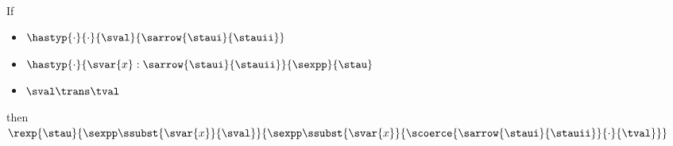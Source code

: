\begin{corollary} \ \\
  If
  \begin{itemize}
  \item $\hastyp{\cdot}{\cdot}{\sval}{\sarrow{\staui}{\stauii}}$
  \item $\hastyp{\cdot}{\svar{x} : \sarrow{\staui}{\stauii}}{\sexpp}{\stau}$
  \item $\sval \trans \tval$
  \end{itemize}
  then
  $\rexp{\stau}{\sexpp\ssubst{\svar{x}}{\sval}}
    {\sexpp\ssubst{\svar{x}}{\scoerce{\sarrow{\staui}{\stauii}}{\cdot}{\tval}}}$
\end{corollary}
